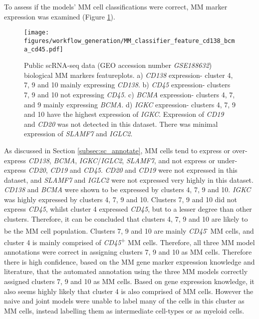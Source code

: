 To assess if the models' MM cell classifications were correct, MM marker expression was examined (Figure \ref{fig:mm_class_ftp_cd138_cd45_bcma}).
\begin{figure}[htb]
\centering
\texttt{[image: figures/workflow\_generation/MM\_classifier\_feature\_cd138\_bcma\_cd45.pdf]}
\caption[Public scRNA-seq data bioligical MM markers featureplots]{Public scRNA-seq data (GEO accession number \textit{GSE188632}) biological MM markers featureplots.
a) \textit{CD138} expression- cluster 4, 7, 9 and 10 mainly expressing \textit{CD138}.
b) \textit{CD45} expression- clusters 7, 9 and 10 not expressing \textit{CD45}.
c) \textit{BCMA} expression- clusters 4, 7, and 9 mainly expressing \textit{BCMA}.
d) \textit{IGKC} expression- clusters 4, 7, 9 and 10 have the highest expression of \textit{IGKC}.
Expression of \textit{CD19} and \textit{CD20} was not detected in this dataset.
There was minimal expression of \textit{SLAMF7} and \textit{IGLC2}.
}
\label{fig:mm_class_ftp_cd138_cd45_bcma}
\end{figure}
%
As discussed in Section \ref{subsec:sc_annotate}, MM cells tend to express or over-express \textit{CD138}, \textit{BCMA}, \textit{IGKC}/\textit{IGLC2}, \textit{SLAMF7}, and not express or under-express \textit{CD20}, \textit{CD19} and \textit{CD45}.
\textit{CD20} and \textit{CD19} were not expressed in this dataset, and \textit{SLAMF7} and \textit{IGLC2} were not expressed very highly in this dataset.
\textit{CD138} and \textit{BCMA} were shown to be expressed by clusters 4, 7, 9 and 10.
\textit{IGKC} was highly expressed by clusters 4, 7, 9 and 10.
Clusters 7, 9 and 10 did not express \textit{CD45}, whilst cluster 4 expressed \textit{CD45}, but to a lesser degree than other clusters.
Therefore, it can be concluded that clusters 4, 7, 9 and 10 are likely to be the MM cell population.
Clusters 7, 9 and 10 are mainly \textit{CD45}\textsuperscript{-} MM cells, and cluster 4 is mainly comprised of \textit{CD45}\textsuperscript{+} MM cells.
Therefore, all three MM model annotations were correct in assigning clusters 7, 9 and 10 as MM cells.
Therefore there is high confidence, based on the MM gene marker expression knowledge and literature, that the automated annotation using the three MM models correctly assigned clusters 7, 9 and 10 as MM cells.
Based on gene expression knowledge, it also seems highly likely that cluster 4 is also comprised of MM cells.
However the naive and joint models were unable to label many of the cells in this cluster as MM cells, instead labelling them as intermediate cell-types or as myeloid cells.

